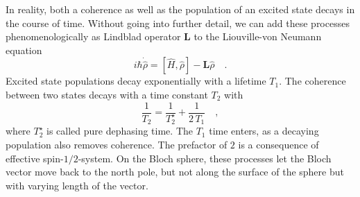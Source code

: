 In reality, both a coherence as well as the population of an excited state decays in the course of time. Without going into further detail, we can add these processes phenomenologically as Lindblad operator $\boldsymbol{L}$ to the Liouville-von Neumann equation
\begin{equation}
    i\hbar \dot{\hat{\rho}} =
    [\hat{H},\hat{\rho}] - \boldsymbol{L}  \hat{\rho} \quad .
\end{equation}
Excited state populations decay exponentially with a lifetime $T_1$. The coherence between two states decays with a time constant $T_2$ with
\begin{equation}
    \frac{1}{T_2} = \frac{1}{T_2^\star} + \frac{1}{2 \, T_1} \quad ,
\end{equation}
where $T_2^\star$ is called pure dephasing time. The $T_1$ time enters, as a decaying population also removes coherence. The prefactor of $2$ is a consequence of effective spin-$1/2$-system. On the Bloch sphere, these processes let the Bloch vector move back to the north pole, but not along the surface of the sphere but with varying length of the vector.



\printbibliography[segment=\therefsegment,heading=subbibliography]
